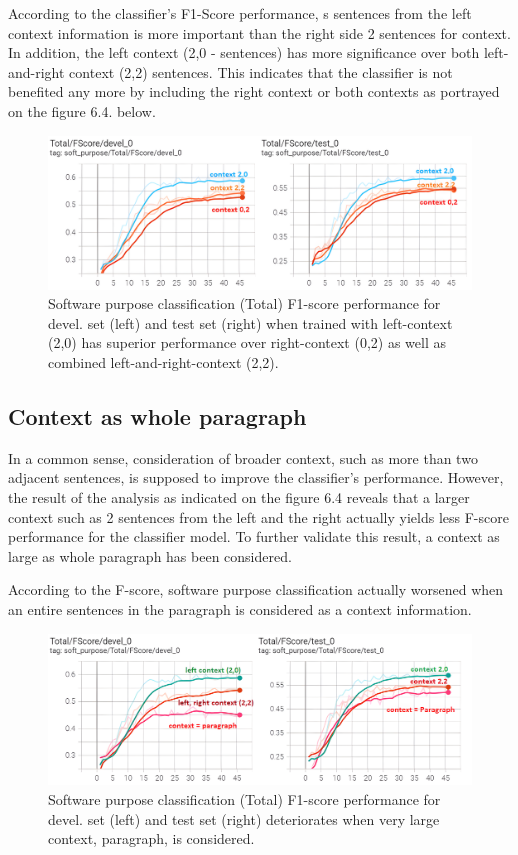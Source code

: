 According to the classifier's F1-Score performance, s sentences from the left context information is more important than the right side 2 sentences for context. In addition, the left context (2,0 - sentences) has more significance over both left-and-right context (2,2) sentences. This indicates that the classifier is not benefited any more by including the right context or both contexts as portrayed on the figure 6.4. below. 

\begin{figure}[htbp]
	\centering
	\includegraphics[width=.90\textwidth]{4.graphics/figures/ch_6/2.left_context_vs_right/HD/left_both_right_hd}
	\caption{Software purpose classification (Total) F1-score performance for devel. set (left) and test set (right) when trained with left-context (2,0) has superior performance over right-context (0,2) as well as combined left-and-right-context (2,2).}
	\label{fig:chapter06:with}
\end{figure}


\subsection{Context as whole paragraph}
\label{sec:chapter06:paragraph}

In a common sense, consideration of broader context, such as more than two adjacent sentences, is supposed to improve the classifier’s performance. However, the result of the analysis as indicated on the figure 6.4 reveals that a larger context such as 2 sentences from the left and the right actually yields less F-score performance for the classifier model. To further validate this result, a context as large as whole paragraph has been considered. 

According to the F-score, software purpose classification actually worsened when an entire sentences in the paragraph is considered as a context information. 

\begin{figure}[htbp]
	\centering
	\includegraphics[width=.90\textwidth]{4.graphics/figures/ch_6/2.left_context_vs_right/HD/context_paragrapgh}
	\caption{Software purpose classification (Total) F1-score performance for devel. set (left) and test set (right) deteriorates when very large context, paragraph, is considered.}
	\label{fig:chapter06:with}
\end{figure}


